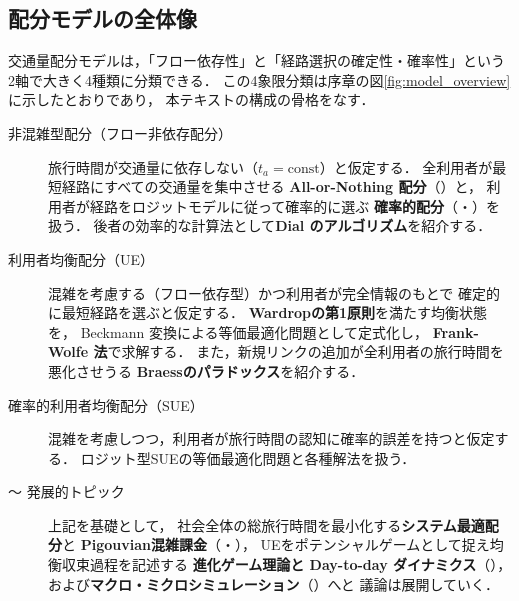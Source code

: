 \subsection{配分モデルの全体像}
\label{subsec:model-overview}

交通量配分モデルは，「フロー依存性」と「経路選択の確定性・確率性」という
2軸で大きく4種類に分類できる\cite{Sheffi1985}．
この4象限分類は序章の図\ref{fig:model_overview}に示したとおりであり，
本テキストの構成の骨格をなす．

\begin{description}
  \item[ \quad 非混雑型配分（フロー非依存配分）]
    旅行時間が交通量に依存しない（$t_a = \text{const}$）と仮定する．
    全利用者が最短経路にすべての交通量を集中させる
    \textbf{All-or-Nothing 配分}（）と，
    利用者が経路をロジットモデルに従って確率的に選ぶ
    \textbf{確率的配分}（・）を扱う．
    後者の効率的な計算法として\textbf{Dial のアルゴリズム}を紹介する\cite{Dial1971}．

  \item[ \quad 利用者均衡配分（UE）]
    混雑を考慮する（フロー依存型）かつ利用者が完全情報のもとで
    確定的に最短経路を選ぶと仮定する．
    \textbf{Wardropの第1原則}を満たす均衡状態を，
    Beckmann 変換による等価最適化問題として定式化し，
    \textbf{Frank-Wolfe 法}で求解する\cite{Beckmann1956,FrankWolfe1956}．
    また，新規リンクの追加が全利用者の旅行時間を悪化させうる
    \textbf{Braessのパラドックス}を紹介する\cite{Braess1968}．

  \item[ \quad 確率的利用者均衡配分（SUE）]
    混雑を考慮しつつ，利用者が旅行時間の認知に確率的誤差を持つと仮定する．
    ロジット型SUEの等価最適化問題と各種解法を扱う\cite{Daganzo1977,Fisk1980}．

  \item[〜 \quad 発展的トピック]
    上記を基礎として，
    社会全体の総旅行時間を最小化する\textbf{システム最適配分}と
    \textbf{Pigouvian混雑課金}（・\cite{Pigou1920}），
    UEをポテンシャルゲームとして捉え均衡収束過程を記述する
    \textbf{進化ゲーム理論と Day-to-day ダイナミクス}（\cite{Sandholm2010}），
    および\textbf{マクロ・ミクロシミュレーション}（\cite{Daganzo2007}）へと
    議論は展開していく．
\end{description}

